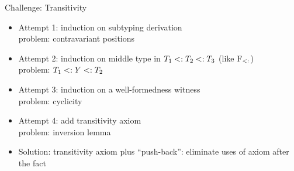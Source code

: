 \documentclass{beamer}
\begin{document}
\begin{frame}[fragile]{Challenge: Transitivity}
\begin{itemize}
\item Attempt 1: induction on subtyping derivation\\problem: contravariant positions
\item Attempt 2: induction on middle type in $T_1 <: T_2 <: T_3$ (like F$_{<:}$)\\problem: $T_1 <: Y <: T_2$
\item Attempt 3: induction on a well-formedness witness\\problem: cyclicity
\item Attempt 4: add transitivity axiom\\problem: inversion lemma
\item Solution: transitivity axiom plus ``push-back'': eliminate 
uses of axiom after the fact
\end{itemize}
\end{frame}
\end{document}
